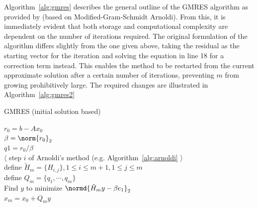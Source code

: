 \noindent Algorithm~\hyperref[alg:gmres]{\ref{alg:gmres}} describes the general outline of the GMRES algorithm as provided by \cite{trefethen_numerical_1997} (based on Modified-Gram-Schmidt Arnoldi). From this, it is immediately evident that both storage and computational complexity are dependent on the number of iterations required. The original formulation of the algorithm \cite{saad_gmres_1986} differs slightly from the one given above, taking the residual as the starting vector for the iteration and solving the equation in line 18 for a correction term instead. This enables the method to be restarted from the current approximate solution after a certain number of iterations, preventing $m$ from growing prohibitively large. The required changes are illustrated in Algorithm~\hyperref[alg:gmres2]{\ref{alg:gmres2}}

\begin{algorithm}[h]
  \caption{GMRES (initial solution based)}
  \label{alg:gmres2}
  \SetAlgoLined
  \DontPrintSemicolon
  $r_0 = b-Ax_0$ \\
  $\beta = \norm{r_0}_2$ \\
  $q1 = r_0/\beta$ \\
   {
   $\langle$ step $i$ of Arnoldi's method (e.g. Algorithm~\hyperref[alg:arnoldi]{\ref{alg:arnoldi}} $\rangle$ \\
  }
  define $\tilde{H}_m = \{H_{i,j}\}, 1 \leq i \leq m+1, 1 \leq j \leq m$ \\
  define $Q_m = \{q_1, \cdots, q_m\}$ \\
  Find $y$ to minimize $\normd{\tilde{H}_my-\beta e_1}_2$ \\
  $x_m = x_0 + Q_my$
\end{algorithm}


